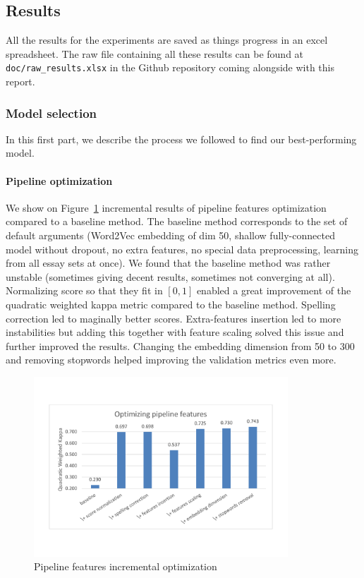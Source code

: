\documentclass[a4paper,12pt,english]{article}
\begin{document}
\subsection{Results}
All the results for the experiments are saved as things progress in an excel spreadsheet. The raw file containing all these results can be found at \verb+doc/raw_results.xlsx+ in the Github repository coming alongside with this report.

\subsubsection{Model selection}
In this first part, we describe the process we followed to find our best-performing model.

\paragraph{Pipeline optimization} We show on Figure~\ref{fig:pipelinefeatures} incremental results of pipeline features optimization compared to a baseline method. The baseline method corresponds to the set of default arguments (Word2Vec embedding of dim 50, shallow fully-connected model without dropout, no extra features, no special data preprocessing, learning from all essay sets at once). We found that the baseline method was rather unstable (sometimes giving decent results, sometimes not converging at all). Normalizing score so that they fit in $[0, 1]$ enabled a great improvement of the quadratic weighted kappa metric compared to the baseline method. Spelling correction led to maginally better scores. Extra-features insertion led to more instabilities but adding this together with feature scaling solved this issue and further improved the results. Changing the embedding dimension from 50 to 300 and removing stopwords helped improving the validation metrics even more.

\begin{figure}
\vspace*{-1.5cm}
	\centering
	\includegraphics[width=0.85\textwidth]{fig/opt_pip_feat.pdf}
	\caption{Pipeline features incremental optimization}
	\label{fig:pipelinefeatures}

\end{figure}
\end{document}
